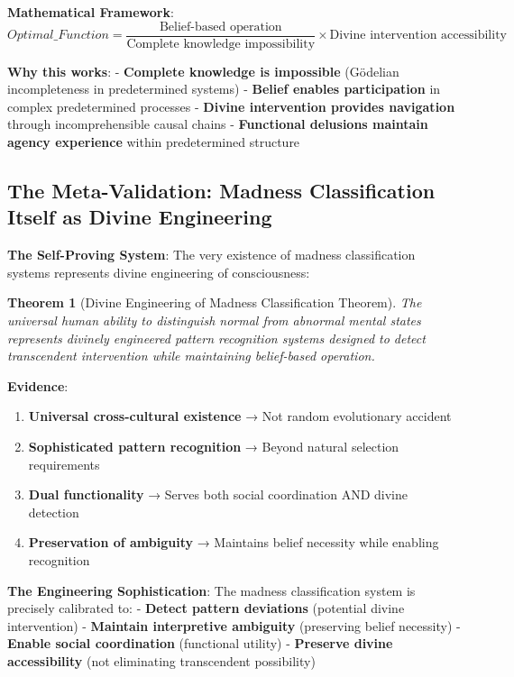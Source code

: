 \documentclass[12pt,a4paper]{article}
\newtheorem{theorem}{Theorem}[section]
\begin{document}
\textbf{Mathematical Framework}:
$$Optimal\_Function = \frac{\text{Belief-based operation}}{\text{Complete knowledge impossibility}} \times \text{Divine intervention accessibility}$$

\textbf{Why this works}:
- \textbf{Complete knowledge is impossible} (Gödelian incompleteness in predetermined systems)
- \textbf{Belief enables participation} in complex predetermined processes
- \textbf{Divine intervention provides navigation} through incomprehensible causal chains
- \textbf{Functional delusions maintain agency experience} within predetermined structure

\subsection{The Meta-Validation: Madness Classification Itself as Divine Engineering}

\textbf{The Self-Proving System}: The very existence of madness classification systems represents divine engineering of consciousness:

\begin{theorem}[Divine Engineering of Madness Classification Theorem]
The universal human ability to distinguish normal from abnormal mental states represents divinely engineered pattern recognition systems designed to detect transcendent intervention while maintaining belief-based operation.
\end{theorem}

\textbf{Evidence}:
\begin{enumerate}
\item \textbf{Universal cross-cultural existence} → Not random evolutionary accident
\item \textbf{Sophisticated pattern recognition} → Beyond natural selection requirements
\item \textbf{Dual functionality} → Serves both social coordination AND divine detection
\item \textbf{Preservation of ambiguity} → Maintains belief necessity while enabling recognition
\end{enumerate}

\textbf{The Engineering Sophistication}:
The madness classification system is precisely calibrated to:
- \textbf{Detect pattern deviations} (potential divine intervention)
- \textbf{Maintain interpretive ambiguity} (preserving belief necessity)
- \textbf{Enable social coordination} (functional utility)
- \textbf{Preserve divine accessibility} (not eliminating transcendent possibility)
\end{document}
